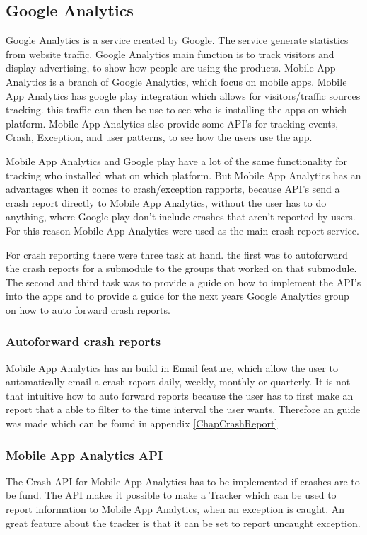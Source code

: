 \subsection{Google Analytics}
Google Analytics is a service created by Google. The service generate statistics from website traffic. Google Analytics main function is to track visitors and display advertising, to show how people are using the products. Mobile App Analytics is a branch of  Google Analytics, which focus on mobile apps. Mobile App Analytics has google play integration which allows for visitors/traffic sources tracking. this traffic can then be use to see who is installing the apps on which platform. Mobile App Analytics also provide some API’s for tracking events, Crash, Exception, and user patterns, to see how the users use the app.

Mobile App Analytics and Google play have a lot of the same functionality for tracking who installed what on which platform. But Mobile App Analytics has an advantages when it comes to crash/exception rapports, because API’s send a crash report directly to Mobile App Analytics, without the user has to do anything, where Google play don’t include crashes that aren’t reported by users. For this reason Mobile App Analytics were used as the main crash report service.  

For crash reporting there were three task at hand. the first was to autoforward the crash reports for a submodule to the groups that worked on that submodule. The second and third task was to provide a guide on how to implement the API’s into the apps and to provide a guide for the next years Google Analytics group on how to auto forward crash reports. 

\subsubsection{Autoforward crash reports}
Mobile App Analytics has an build in Email feature, which allow the user to automatically email a crash report daily, weekly, monthly or quarterly. It is not that intuitive how to auto forward reports because the user has to first make an report that a able to filter to the time interval the user wants. Therefore an guide was made which can be found in appendix \ref{ChapCrashReport}

\subsubsection{Mobile App Analytics API}
The Crash API for Mobile App Analytics has to be implemented if crashes are to be fund. The API makes it possible to make a Tracker which can be used to report information to Mobile App Analytics, when an exception is caught. An great feature about the tracker is that it can be set to report uncaught exception.    